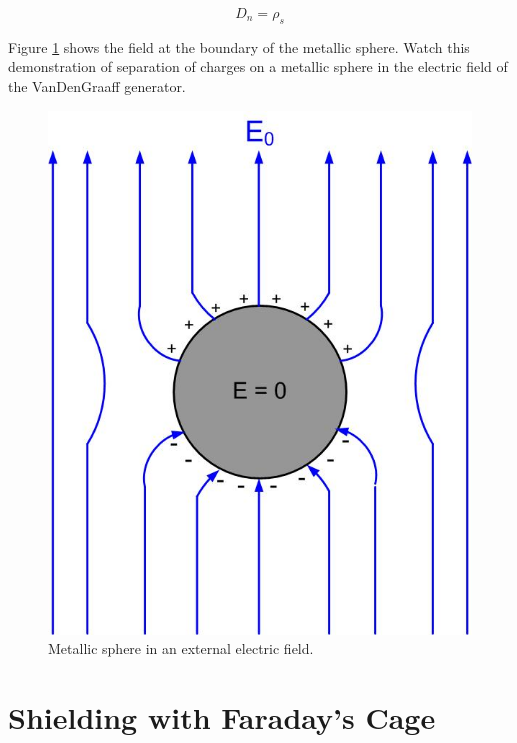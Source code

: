 \documentclass{ximera}
\begin{document}
\begin{equation}
D_n = \rho_s
\end{equation}

Figure \ref{fig:BoundaryConditionMetal} shows the field at the boundary of the metallic sphere. Watch this demonstration of separation of charges on a metallic sphere in the electric field of the VanDenGraaff generator.


\begin{center}  
\end{center} 



\begin{figure}[!ht]
\begin{center}
\includegraphics[scale=0.5]{../jpg/metalsphereinefield.jpg}
\end{center}
\caption{Metallic sphere in an external electric field.}
\label{fig:BoundaryConditionMetal}
\end{figure}


\section{Shielding with Faraday's Cage}
\end{document}
